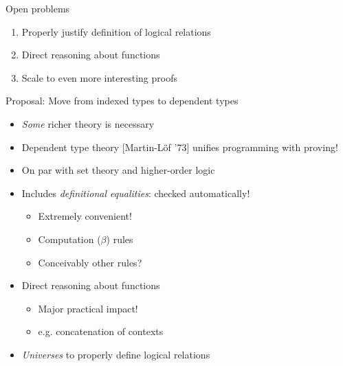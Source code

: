 \documentclass[usenames,dvipsnames]{beamer}
\begin{document}
\begin{frame}{Open problems}
\begin{enumerate}
\item Properly justify definition of logical relations
\item Direct reasoning about functions
\item Scale to even more interesting proofs
\end{enumerate}
\end{frame}

\begin{frame}{Proposal: Move from indexed types to dependent types}
\begin{itemize}
\item \emph{Some} richer theory is necessary
\item Dependent type theory [Martin-L\"of '73] unifies programming with proving!
\item On par with set theory and higher-order logic
\item Includes \emph{definitional equalities}: checked automatically!
\begin{itemize}
\item Extremely convenient!
\item Computation ($\beta$) rules
\item Conceivably other rules?
\end{itemize}
\item Direct reasoning about functions
\begin{itemize}
\item Major practical impact!
\item e.g. concatenation of contexts
\end{itemize}
\item \emph{Universes} to properly define logical relations
\end{itemize}
\end{frame}
\end{document}
